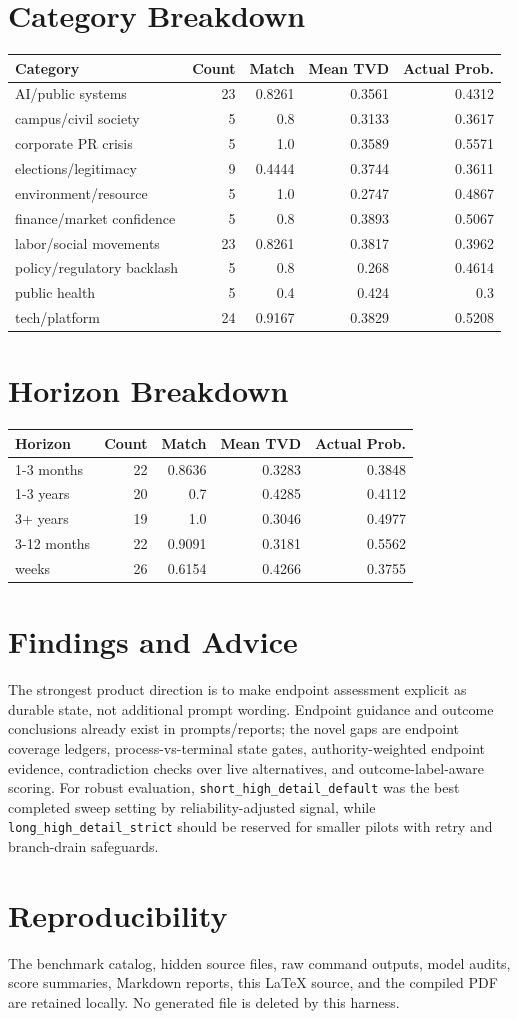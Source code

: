 \documentclass[11pt]{article}
\begin{document}
\section*{Category Breakdown}
\begin{longtable}{lrrrr}
\toprule
Category & Count & Match & Mean TVD & Actual Prob. \\
\midrule
AI/public systems & 23 & 0.8261 & 0.3561 & 0.4312 \\
campus/civil society & 5 & 0.8 & 0.3133 & 0.3617 \\
corporate PR crisis & 5 & 1.0 & 0.3589 & 0.5571 \\
elections/legitimacy & 9 & 0.4444 & 0.3744 & 0.3611 \\
environment/resource & 5 & 1.0 & 0.2747 & 0.4867 \\
finance/market confidence & 5 & 0.8 & 0.3893 & 0.5067 \\
labor/social movements & 23 & 0.8261 & 0.3817 & 0.3962 \\
policy/regulatory backlash & 5 & 0.8 & 0.268 & 0.4614 \\
public health & 5 & 0.4 & 0.424 & 0.3 \\
tech/platform & 24 & 0.9167 & 0.3829 & 0.5208 \\
\bottomrule
\end{longtable}

\section*{Horizon Breakdown}
\begin{longtable}{lrrrr}
\toprule
Horizon & Count & Match & Mean TVD & Actual Prob. \\
\midrule
1-3 months & 22 & 0.8636 & 0.3283 & 0.3848 \\
1-3 years & 20 & 0.7 & 0.4285 & 0.4112 \\
3+ years & 19 & 1.0 & 0.3046 & 0.4977 \\
3-12 months & 22 & 0.9091 & 0.3181 & 0.5562 \\
weeks & 26 & 0.6154 & 0.4266 & 0.3755 \\
\bottomrule
\end{longtable}

\section*{Findings and Advice}
The strongest product direction is to make endpoint assessment explicit as durable state, not additional prompt wording. Endpoint guidance and outcome conclusions already exist in prompts/reports; the novel gaps are endpoint coverage ledgers, process-vs-terminal state gates, authority-weighted endpoint evidence, contradiction checks over live alternatives, and outcome-label-aware scoring. For robust evaluation, \texttt{short\_high\_detail\_default} was the best completed sweep setting by reliability-adjusted signal, while \texttt{long\_high\_detail\_strict} should be reserved for smaller pilots with retry and branch-drain safeguards.

\section*{Reproducibility}
The benchmark catalog, hidden source files, raw command outputs, model audits, score summaries, Markdown reports, this \LaTeX{} source, and the compiled PDF are retained locally. No generated file is deleted by this harness.
\end{document}
